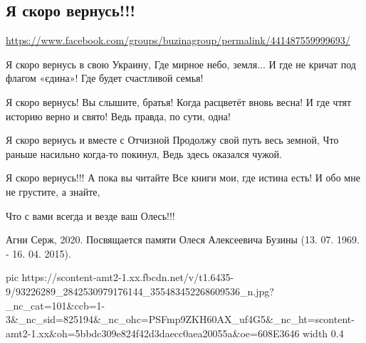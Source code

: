 
 
 
 
 

\subsection{Я скоро вернусь!!!}
\url{https://www.facebook.com/groups/buzinagroup/permalink/441487559999693/}

Я скоро вернусь в свою Украину, 
Где мирное небо, земля...
И где не кричат под флагом «єдина»! 
Где будет счастливой семья!

Я скоро вернусь! Вы слышите, братья! 
Когда расцветёт вновь весна!
И где чтят историю верно и свято! 
Ведь правда, по сути, одна! 

Я скоро вернусь и вместе с Отчизной
Продолжу свой путь весь земной,
Что раньше насильно когда-то покинул, 
Ведь здесь оказался чужой.

Я скоро вернусь!!! А пока вы читайте
Все книги мои, где истина есть!
И обо мне не грустите, а знайте, 

Что с вами всегда и везде ваш Олесь!!!

Агни Серж, 2020. 
Посвящается памяти Олеся Алексеевича Бузины (13. 07. 1969. - 16. 04. 2015).


\ifcmt
  pic https://scontent-amt2-1.xx.fbcdn.net/v/t1.6435-9/93226289_2842530979176144_355483452268609536_n.jpg?_nc_cat=101&ccb=1-3&_nc_sid=825194&_nc_ohc=PSFmp9ZKH60AX_uf4G5&_nc_ht=scontent-amt2-1.xx&oh=5bbdc309e824f42d3daecc0aea20055a&oe=608E3646
  width 0.4
\fi

